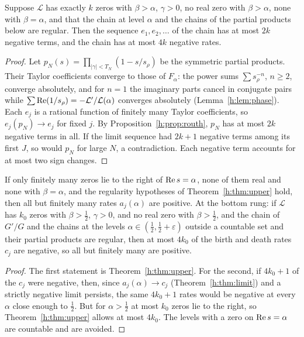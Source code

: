\begin{theorem}\label{h:thm:upper}
Suppose $\mathcal L$ has exactly $k$ zeros with $\beta>\alpha$, $\gamma>0$, no real zero with $\beta>\alpha$, none with $\beta=\alpha$, and that the chain at level $\alpha$ and the chains of the partial products below are regular. Then the sequence $e_1,e_2,\dots$ of the chain has at most $2k$ negative terms, and the chain has at most $4k$ negative rates.
\end{theorem}

\begin{proof}
Let $p_N(s)=\prod_{|\gamma|<T_N}(1-s/s_\rho)$ be the symmetric partial products. Their Taylor coefficients converge to those of $F_\alpha$: the power sums $\sum s_\rho^{-n}$, $n\ge2$, converge absolutely, and for $n=1$ the imaginary parts cancel in conjugate pairs while $\sum\operatorname{Re}(1/s_\rho)=-\mathcal L'/\mathcal L(\alpha)$ converges absolutely (Lemma~\ref{h:lem:phase}). Each $e_j$ is a rational function of finitely many Taylor coefficients, so $e_j(p_N)\to e_j$ for fixed $j$. By Proposition~\ref{h:prop:routh}, $p_N$ has at most $2k$ negative terms in all. If the limit sequence had $2k+1$ negative terms among its first $J$, so would $p_N$ for large $N$, a contradiction. Each negative term accounts for at most two sign changes.
\end{proof}

\begin{corollary}\label{h:cor:eventual}
If only finitely many zeros lie to the right of $\operatorname{Re} s=\alpha$, none of them real and none with $\beta=\alpha$, and the regularity hypotheses of Theorem~\ref{h:thm:upper} hold, then all but finitely many rates $a_j(\alpha)$ are positive. At the bottom rung: if $\mathcal L$ has $k_0$ zeros with $\beta>\frac12$, $\gamma>0$, and no real zero with $\beta>\frac12$, and the chain of $G'/G$ and the chains at the levels $\alpha\in(\frac12,\frac12+\varepsilon)$ outside a countable set and their partial products are regular, then at most $4k_0$ of the birth and death rates $c_j$ are negative, so all but finitely many are positive.
\end{corollary}

\begin{proof}
The first statement is Theorem~\ref{h:thm:upper}. For the second, if $4k_0+1$ of the $c_j$ were negative, then, since $a_j(\alpha)\to c_j$ (Theorem~\ref{h:thm:limit}) and a strictly negative limit persists, the same $4k_0+1$ rates would be negative at every $\alpha$ close enough to $\frac12$. But for $\alpha>\frac12$ at most $k_0$ zeros lie to the right, so Theorem~\ref{h:thm:upper} allows at most $4k_0$. The levels with a zero on $\operatorname{Re} s=\alpha$ are countable and are avoided.
\end{proof}

